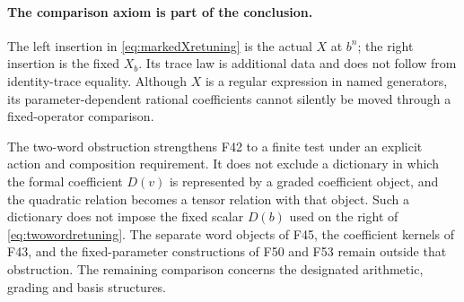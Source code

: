 \documentclass[11pt,a4paper]{article}
\newcommand{\fid}[1]{\textsf{#1}}\newcommand{\gate}[1]{\textsf{#1}}
\theoremstyle{named}\newtheorem{finding}{Finding}[section]
\theoremstyle{definition}\newtheorem{definition}[finding]{Definition}
\theoremstyle{remark}\newtheorem{remark}[finding]{Remark}
\begin{document}
\paragraph{The comparison axiom is part of the conclusion.}
The left insertion in \eqref{eq:markedXretuning} is the
actual $X$ at $b^n$; the right insertion is the fixed
$X_b$.
Its trace law is additional data and does not follow
from identity-trace equality.
Although $X$ is a regular expression in named generators,
its parameter-dependent rational coefficients cannot
silently be moved through a fixed-operator comparison.

The two-word obstruction strengthens \fid{F42} to a
finite test under an explicit action and composition
requirement.
It does not exclude a dictionary in which the formal
coefficient $D(v)$ is represented by a graded coefficient
object, and the quadratic relation becomes a tensor
relation with that object.
Such a dictionary does not impose the fixed scalar
$D(b)$ used on the right of \eqref{eq:twowordretuning}.
The separate word objects of \fid{F45}, the coefficient
kernels of \fid{F43}, and the fixed-parameter constructions
of \fid{F50} and \fid{F53} remain outside that obstruction.
The remaining comparison concerns the designated
arithmetic, grading and basis structures.
\end{document}
